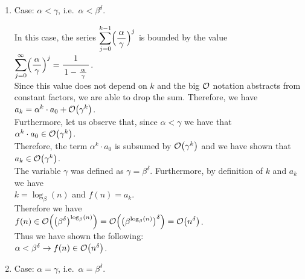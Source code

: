 \begin{enumerate}
\item Case: $\alpha < \gamma$, i.e.~$\alpha < \beta^\delta$.

      In this case, the series $\displaystyle\sum\limits_{j=0}^{k-1} \Bigl(\frac{\,\alpha\,}{\gamma}\Bigr)^j$ is bounded 
      by the value
      \\[0.2cm]
      \hspace*{1.3cm}
      $\displaystyle \sum\limits_{j=0}^{\infty} \Bigl(\frac{\,\alpha\,}{\gamma}\Bigr)^j = \bruch{1}{1 - \frac{\,\alpha\,}{\gamma}}$.
      \\[0.2cm]
      Since this value does not depend on $k$ and the big $\mathcal{O}$ notation abstracts from constant factors,
      we are able to drop the sum.  Therefore, we have
      \\[0.2cm]
      \hspace*{1.3cm}
      $a_k = \alpha^k \cdot a_0 + \mathcal{O}\bigl(\gamma^k\bigr)$.
      \\[0.2cm] 
      Furthermore, let us observe that, since $\alpha < \gamma$ we have that 
      \\[0.2cm]
      \hspace*{1.3cm}
      $\alpha^k \cdot a_0 \in \mathcal{O}\bigl(\gamma^k\bigr)$.
      \\[0.2cm]
      Therefore, the term $\alpha^k \cdot a_0$ is subsumed by $\mathcal{O}\bigl(\gamma^k\bigr)$ and we have shown that
      \\[0.2cm]
      \hspace*{1.3cm}
      $a_k \in \mathcal{O}\bigl(\gamma^k\bigr)$.
      \\[0.2cm]
      The variable $\gamma$ was defined as $\gamma = \beta^\delta$.  Furthermore, by definition of $k$ and $a_k$
      we have 
      \\[0.2cm]
      \hspace*{1.3cm}
      $k = \log_{\beta}(n)$ \quad and \quad $f(n) = a_k$.  
      \\[0.2cm]
      Therefore we have 
      \\[0.2cm]
      \hspace*{1.3cm}
      $\displaystyle f(n) \in \mathcal{O}\Bigl(\bigl(\beta^\delta\bigr)^{\log_{\beta}(n)}\Bigr) = \mathcal{O}\Bigl(\bigl(\beta^{\log_{\beta}(n)}\bigr)^\delta\Bigr) = \mathcal{O}\bigl(n^\delta\bigr)$.
      \\[0.2cm] 
      Thus we have shown the following:
      \\[0.2cm]
      \hspace*{1.3cm}
      $\alpha < \beta^\delta \rightarrow f(n) \in \mathcal{O}\bigl(n^\delta\bigr)$.
\item Case: $\alpha = \gamma$, i.e.~$\alpha = \beta^\delta$.


\end{enumerate}
